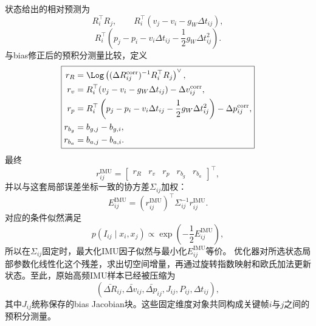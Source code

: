 状态给出的相对预测为
\[
    R_i^\top R_j,
    \qquad
    R_i^\top(v_j-v_i-g_W\Delta t_{ij}),
\]
\[
    R_i^\top
    \left(
      p_j-p_i-v_i\Delta t_{ij}
      -\frac12g_W\Delta t_{ij}^2
    \right).
\]
与bias修正后的预积分测量比较，定义
\[
\boxed{
\begin{aligned}
    r_R
    &=\Log\left(
      (\Delta R_{ij}^{\mathrm{corr}})^{-1}R_i^\top R_j
      \right)^\vee,\\
    r_v
    &=R_i^\top(v_j-v_i-g_W\Delta t_{ij})
      -\Delta v_{ij}^{\mathrm{corr}},\\
    r_p
    &=R_i^\top
      \left(
        p_j-p_i-v_i\Delta t_{ij}
        -\frac12g_W\Delta t_{ij}^2
      \right)
      -\Delta p_{ij}^{\mathrm{corr}},\\
    r_{b_g}
    &=b_{g,j}-b_{g,i},\\
    r_{b_a}
    &=b_{a,j}-b_{a,i}.
\end{aligned}
}
\]
最终
\[
\boxed{
    r_{ij}^{\mathrm{IMU}}
    =\begin{bmatrix}
      r_R&r_v&r_p&r_{b_g}&r_{b_a}
     \end{bmatrix}^\top,
}
\]
并以与这套局部误差坐标一致的协方差$\Sigma_{ij}$加权：
\[
\boxed{
    E_{ij}^{\mathrm{IMU}}
    =(r_{ij}^{\mathrm{IMU}})^\top
      \Sigma_{ij}^{-1}r_{ij}^{\mathrm{IMU}}.
}
\]
对应的条件似然满足
\[
    p(I_{ij}\mid x_i,x_j)
    \propto
    \exp\left(-\frac12E_{ij}^{\mathrm{IMU}}\right),
\]
所以在$\Sigma_{ij}$固定时，最大化IMU因子似然与最小化$E_{ij}^{\mathrm{IMU}}$等价。
优化器对所选状态局部参数化线性化这个残差，求出切空间增量，再通过旋转指数映射和欧氏加法更新状态。至此，原始高频IMU样本已经被压缩为
\[
\boxed{
\left(
\bar{\Delta R}_{ij},
\bar{\Delta v}_{ij},
\bar{\Delta p}_{ij},
J_{ij},
P_{ij},
\Delta t_{ij}
\right),
}
\]
其中$J_{ij}$统称保存的bias Jacobian块。这些固定维度对象共同构成关键帧$i$与$j$之间的预积分测量。

